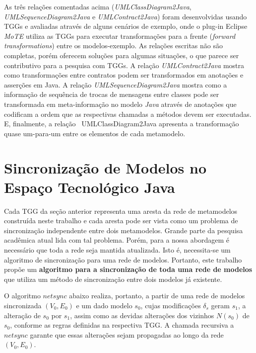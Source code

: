 \documentclass[cic,resumo-unibral]{iiufrgs}
\begin{document}
\begin{extendedsummary}
As três relações comentadas acima (\textit{UMLClassDiagram2Java}, \textit{UMLSequenceDiagram2Java} e \textit{UMLContract2Java}) foram desenvolvidas usando TGGs e avaliadas através de alguns cenários de exemplo, onde o plug-in Eclipse \emph{MoTE} utiliza as TGGs para executar transformações para a frente (\textit{forward transformations}) entre os modelos-exemplo. As relações escritas não são completas, porém oferecem soluções para algumas situações, o que parece ser contributivo para a pesquisa com TGGs. A relação \textit{UMLContract2Java} mostra como transformações entre contratos podem ser transformados em anotações e asserções em Java. A relação \textit{UMLSequenceDiagram2Java} mostra como a informação de sequência de trocas de mensagens entre classes pode ser transformada em meta-informação no modelo \textit{Java} através de anotações que codificam a ordem que as respectivas chamadas a métodos devem ser executadas. E, finalmente, a relação \
{UMLClassDiagram2Java} apresenta a transformação quase um-para-um entre os elementos de cada metamodelo.


\section{Sincronização de Modelos no Espaço Tecnológico Java}

Cada TGG da seção anterior representa uma aresta da rede de metamodelos construída neste trabalho e cada aresta pode ser vista como um problema de sincronização independente entre dois metamodelos. Grande parte da pesquisa acadêmica atual lida com tal problema. Porém, para a nossa abordagem é necessário que toda a rede seja mantida atualizada. Isto é, necessita-se um algoritmo de sincronização para uma rede de modelos. Portanto, este trabalho propõe um \textbf{algoritmo para a sincronização de toda uma rede de modelos} que utiliza um método de sincronização entre dois modelos já existente.


O algoritmo $netsync$ abaixo realiza, portanto, a partir de uma rede de modelos sincronizada $(V_0,E_0)$ e um dado modelo $s_0$, cujas modificações $\delta_s$ geram $s_1$, a alteração de $s_0$ por $s_1$, assim como as devidas alterações dos vizinhos $N(s_0)$ de $s_0$, conforme as regras definidas na respectiva TGG. A chamada recursiva a $netsync$ garante que essas alterações sejam propagadas ao longo da rede $(V_0,E_0)$.


\end{extendedsummary}
\end{document}
